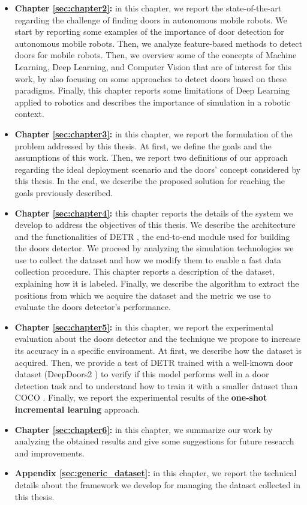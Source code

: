 \begin{itemize}
	\item \textbf{Chapter \ref{sec:chapter2}:} in this chapter, we report the state-of-the-art regarding the challenge of finding doors in autonomous mobile robots. We start by reporting some examples of the importance of door detection for autonomous mobile robots. Then, we analyze feature-based methods to detect doors for mobile robots. Then, we overview some of the concepts of Machine Learning, Deep Learning, and Computer Vision that are of interest for this work, by also focusing on some approaches to detect doors based on these paradigms. Finally, this chapter reports some limitations of Deep Learning applied to robotics and describes the importance of simulation in a robotic context.
	
	\item \textbf{Chapter \ref{sec:chapter3}:} in this chapter, we report the formulation of the problem addressed by this thesis. At first, we define the goals and the assumptions of this work. Then, we report two definitions of our approach regarding the ideal deployment scenario and the doors' concept considered by this thesis. In the end, we describe the proposed solution for reaching the goals previously described.
	
	\item \textbf{Chapter \ref{sec:chapter4}:} this chapter reports the details of the system we develop to address the objectives of this thesis. We describe the architecture and the functionalities of DETR \cite{detr}, the end-to-end module used for building the doors detector. We proceed by analyzing the simulation technologies we use to collect the dataset and how we modify them to enable a fast data collection procedure. This chapter reports a description of the dataset, explaining how it is labeled. Finally, we describe the algorithm to extract the positions from which we acquire the dataset and the metric we use to evaluate the doors detector's performance.
	
	\item \textbf{Chapter \ref{sec:chapter5}:} in this chapter, we report the experimental evaluation about the doors detector and the technique we propose to increase its accuracy in a specific environment. At first, we describe how  the dataset is acquired. Then, we provide a test of DETR trained with a well-known door dataset (DeepDoors2 \cite{deepdoors2}) to verify if this model performs well in a door detection task and to understand how to train it with a smaller dataset than COCO \cite{coco}. Finally, we report the experimental results of the \textbf{one-shot incremental learning} approach.
	
	\item \textbf{Chapter \ref{sec:chapter6}:} in this chapter, we summarize our work by analyzing the obtained results and give some suggestions for future research and improvements.
	
	\item \textbf{Appendix \ref{sec:generic_dataset}:} in this chapter, we report the technical details about the framework we develop for managing the dataset collected in this thesis.
\end{itemize}
